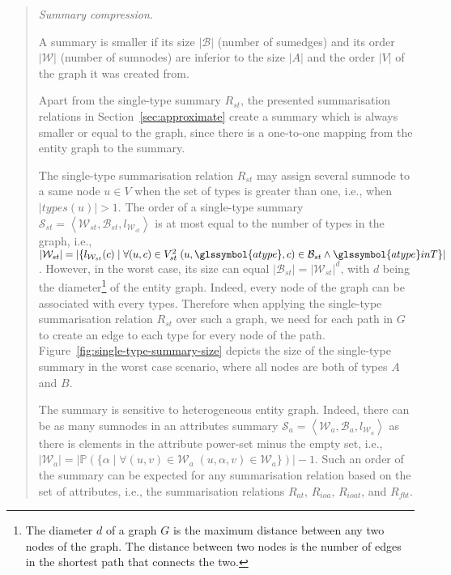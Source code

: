 \begin{quotation}
	\item[\emph{Summary compression.}]

	A summary is smaller if its size $\vert \mathcal{B} \vert$ (number of sumedges) and its order $\vert \mathcal{W} \vert$ (number of sumnodes) are inferior to the size $\vert A \vert$ and the order $\vert V \vert$ of the graph it was created from.

	Apart from the single-type summary $R_{st}$, the presented summarisation relations in Section~\ref{sec:approximate} create a summary which is always smaller or equal to the graph, since there is a one-to-one mapping from the entity graph to the summary.

	The single-type summarisation relation $R_{st}$ may assign several sumnode to a same node $u \in V$ when the set of types is greater than one, i.e., when $\vert types(u) \vert > 1$. The order of a single-type summary $\mathcal{S}_{st} = \left\langle \mathcal{W}_{st}, \mathcal{B}_{st}, l_{\mathcal{W}_{st}} \right\rangle$ is at most equal to the number of types in the graph, i.e., $\vert \mathcal{W}_{st} \vert = \vert \{ l_{\mathcal{W}_{st}}(c) \mid \forall (u, c) \in V^2_{st}\; (u, \glssymbol{atype}, c) \in \mathcal{B}_{st} \wedge \glssymbol{atype} in T \} \vert$. However, in the worst case, its size can equal $\vert \mathcal{B}_{st} \vert = \vert \mathcal{W}_{st} \vert ^d$, with $d$ being the diameter\footnote{The diameter $d$ of a graph $G$ is the maximum distance between any two nodes of the graph. The distance between two nodes is the number of edges in the shortest path that connects the two.} of the entity graph. Indeed, every node of the graph can be associated with every types. Therefore when applying the single-type summarisation relation $R_{st}$ over such a graph, we need for each path in $G$ to create an edge to each type for every node of the path. Figure~\ref{fig:single-type-summary-size} depicts the size of the single-type summary in the worst case scenario, where all nodes are both of types $A$ and $B$.

	The summary is sensitive to heterogeneous entity graph. Indeed, there can be as many sumnodes in an attributes summary $\mathcal{S}_a = \left\langle \mathcal{W}_{a}, \mathcal{B}_{a}, l_{\mathcal{W}_{a}} \right\rangle$ as there is elements in the attribute power-set minus the empty set, i.e., $\vert \mathcal{W}_a \vert = \vert \mathbb{P} \left( \{ \alpha \mid \forall (u, v) \in \mathcal{W}_a\; (u, \alpha, v) \in \mathcal{W}_a \} \right) \vert - 1$. Such an order of the summary can be expected for any summarisation relation based on the set of attributes, i.e., the summarisation relations $R_{at}$, $R_{ioa}$, $R_{ioat}$, and $R_{fbt}$.\\


\end{quotation}
